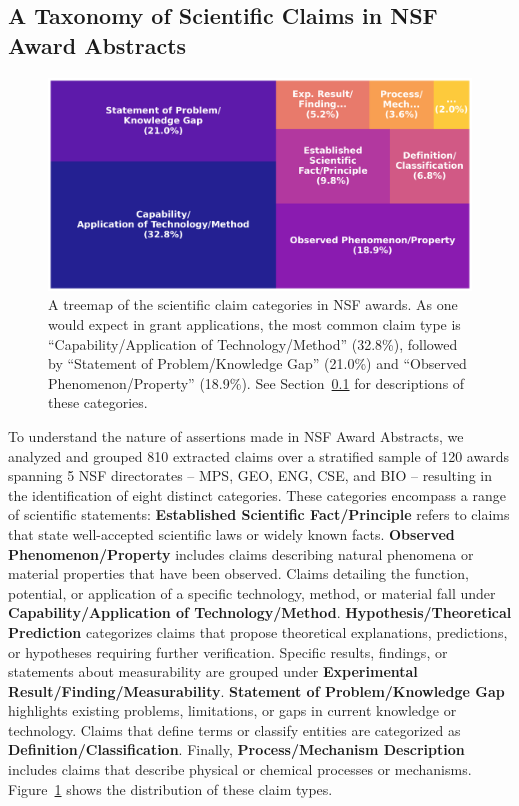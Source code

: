 \documentclass[11pt]{article}
\begin{document}
\subsection{A Taxonomy of Scientific Claims in NSF Award Abstracts}
\label{sec:claim-taxonomy}
\begin{figure}
    \centering
    \includegraphics[width=1\linewidth]{images/category_treemap.pdf}
    \caption{A treemap of the scientific claim categories in NSF awards. As one would expect in grant applications, the most common claim type is ``Capability/Application of Technology/Method'' (32.8\%), followed by ``Statement of Problem/Knowledge Gap'' (21.0\%) and ``Observed Phenomenon/Property'' (18.9\%). See Section~\ref{sec:claim-taxonomy} for descriptions of these categories.}
    \label{fig:claim-category-treemap}
\end{figure}
To understand the nature of assertions made in NSF Award Abstracts, we analyzed and grouped 810 extracted claims over a stratified sample of 120 awards spanning 5 NSF directorates -- MPS, GEO, ENG, CSE, and BIO -- resulting in the identification of eight distinct categories. These categories encompass a range of scientific statements: \textbf{Established Scientific Fact/Principle} refers to claims that state well-accepted scientific laws or widely known facts. \textbf{Observed Phenomenon/Property} includes claims describing natural phenomena or material properties that have been observed. Claims detailing the function, potential, or application of a specific technology, method, or material fall under \textbf{Capability/Application of Technology/Method}. \textbf{Hypothesis/Theoretical Prediction} categorizes claims that propose theoretical explanations, predictions, or hypotheses requiring further verification. Specific results, findings, or statements about measurability are grouped under \textbf{Experimental Result/Finding/Measurability}. \textbf{Statement of Problem/Knowledge Gap} highlights existing problems, limitations, or gaps in current knowledge or technology. Claims that define terms or classify entities are categorized as \textbf{Definition/Classification}. Finally, \textbf{Process/Mechanism Description} includes claims that describe physical or chemical processes or mechanisms. Figure~\ref{fig:claim-category-treemap} shows the distribution of these claim types.
\end{document}
